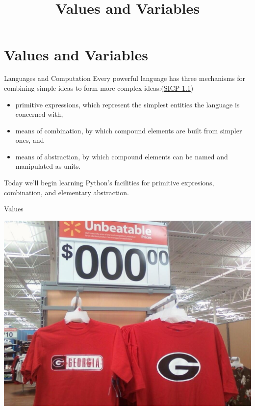 \documentclass[smaller, aspectratio=1610]{beamer}
\date{}
\title{Values and Variables}
\begin{document}
\maketitle


\section{Values and Variables}
\label{sec:org503209e}

\begin{frame}[label={sec:orgbd0c550}]{Languages and Computation}
Every powerful language has three mechanisms for combining simple ideas to form more complex ideas:(\href{http://mitpress.mit.edu/sicp/full-text/book/book-Z-H-10.html}{SICP 1.1})

\begin{itemize}
\item \alert{primitive expressions}, which represent the simplest entities the language is concerned with,
\item \alert{means of combination}, by which compound elements are built from simpler ones, and
\item \alert{means of abstraction}, by which compound elements can be named and manipulated as units.
\end{itemize}

Today we'll begin learning Python's facilities for primitive expresions, combination, and elementary abstraction.
\end{frame}

\begin{frame}[label={sec:orgcaa7a54}]{Values}
\begin{center}
\includegraphics[height=.7\textheight]{../../images/value-uga-shirt.jpeg}
\end{center}
\end{frame}
\end{document}
